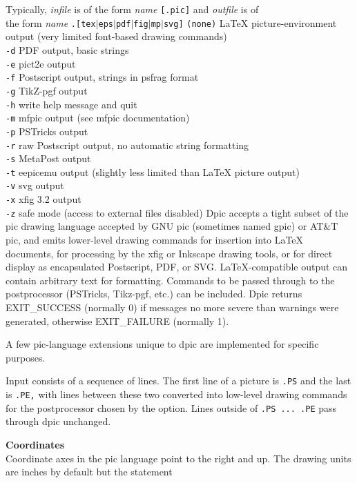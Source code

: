 Typically,
{\it infile}
is of the form
{\it name}
{\tt [.pic]}
and
{\it outfile}
is of
\\\hbox{}\hskip-1pt
the form
{\it name}
{\tt .[tex$|$eps$|$pdf$|$fig$|$mp$|$svg]}
{\tt (none)}
LaTeX picture-environment output (very limited font-based drawing commands)
\\\hbox{}\hskip-1pt
{\tt -d}
PDF output, basic strings
\\\hbox{}\hskip-1pt
{\tt -e}
pict2e output
\\\hbox{}\hskip-1pt
{\tt -f}
Postscript output, strings in psfrag format
\\\hbox{}\hskip-1pt
{\tt -g}
TikZ-pgf output
\\\hbox{}\hskip-1pt
{\tt -h}
write help message and quit
\\\hbox{}\hskip-1pt
{\tt -m}
mfpic output (see mfpic documentation)
\\\hbox{}\hskip-1pt
{\tt -p}
PSTricks output
\\\hbox{}\hskip-1pt
{\tt -r}
raw Postscript output, no automatic string formatting
\\\hbox{}\hskip-1pt
{\tt -s}
MetaPost output
\\\hbox{}\hskip-1pt
{\tt -t}
eepicemu output (slightly less limited than LaTeX picture output)
\\\hbox{}\hskip-1pt
{\tt -v}
svg output
\\\hbox{}\hskip-1pt
{\tt -x}
xfig 3.2 output
\\\hbox{}\hskip-1pt
{\tt -z}
safe mode (access to external files disabled)
%
Dpic accepts a tight subset of the pic drawing language accepted by
GNU pic (sometimes named gpic) or AT\&T pic, and emits lower-level
drawing commands for insertion into LaTeX documents, for processing by
the xfig or Inkscape drawing tools, or for direct display as encapsulated
Postscript, PDF, or SVG. LaTeX-compatible output can contain arbitrary
text for formatting.  Commands to be passed through to the postprocessor
(PSTricks, Tikz-pgf, etc.)  can be included.  Dpic returns EXIT\_SUCCESS
(normally 0) if messages no more severe than warnings were generated,
otherwise EXIT\_FAILURE (normally 1).

A few pic-language extensions unique to dpic
are implemented for specific purposes.

Input consists of a sequence of lines.
The first line of a picture is
{\tt .PS}
and the last is
{\tt .PE,}
with lines between
these two converted into low-level drawing commands for the postprocessor
chosen by the option.
Lines outside of
{\tt .PS\ ...\ .PE}
pass through dpic unchanged.
\par\hskip-2pc{\bf Coordinates}\\
Coordinate axes in the pic
language point to the right and up.
The drawing units are inches by default but the statement

